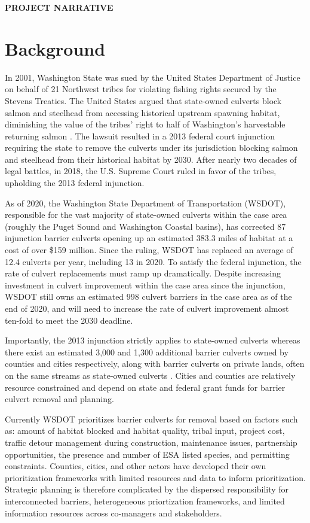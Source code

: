 \documentclass[12pt]{elsarticle}
\begin{document}
\begin{center} \textbf{PROJECT NARRATIVE} \end{center}


\section{Background} 
 In 2001, Washington State was sued by the United States Department of Justice on behalf of 21 Northwest tribes for violating fishing rights secured by the Stevens Treaties. The United States argued that state-owned culverts block salmon and steelhead from accessing historical upstream spawning habitat, diminishing the value of the tribes' right to half of Washington's harvestable returning salmon \citep{hickey2018highway}. The lawsuit resulted in a 2013 federal court injunction requiring  the state to remove the culverts under its jurisdiction blocking salmon and steelhead from their historical habitat by 2030. After nearly two decades of legal battles, in 2018, the U.S. Supreme Court ruled in favor of the tribes, upholding the 2013 federal injunction. 

As of 2020, the Washington State Department of Transportation (WSDOT), responsible for the vast majority of state-owned culverts within the case area (roughly the Puget Sound and Washington Coastal basins), has corrected 87 injunction barrier culverts opening up an estimated 383.3 miles of habitat at a cost of over \$159 million. Since the ruling, WSDOT has replaced an average of 12.4 culverts per year, including 13 in 2020. To satisfy the federal injunction, the rate of culvert replacements must ramp up dramatically. Despite increasing investment in culvert improvement within the case area since the injunction, WSDOT still owns an estimated 998 culvert barriers in the case area as of the end of 2020, and will need to increase the rate of culvert improvement almost ten-fold to meet the 2030 deadline.  

Importantly, the 2013 injunction strictly applies to state-owned culverts whereas there exist an estimated 3,000 and 1,300 additional barrier culverts owned by counties and cities respectively, along with barrier culverts on private lands, often on the same streams as state-owned culverts \citep{brown2019coming}. Cities and counties are relatively resource constrained and depend on state and federal grant funds for barrier culvert removal and planning.

Currently WSDOT prioritizes barrier culverts for removal based on factors such as: amount of habitat blocked and habitat quality, tribal input, project cost, traffic detour management during construction, maintenance issues, partnership opportunities, the presence and number of ESA listed species, and permitting constraints. Counties, cities, and other actors have developed their own prioritization frameworks with limited resources and data to inform prioritization. Strategic planning is therefore complicated by the dispersed responsibility for interconnected barriers, heterogeneous priortization frameworks, and limited information resources across co-managers and stakeholders.
\end{document}
